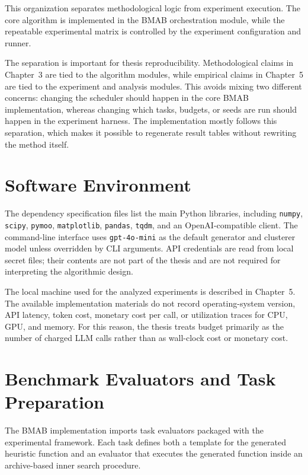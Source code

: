 This organization separates methodological logic from experiment execution. The core algorithm is implemented in the BMAB orchestration module, while the repeatable experimental matrix is controlled by the experiment configuration and runner.

The separation is important for thesis reproducibility. Methodological claims in Chapter~3 are tied to the algorithm modules, while empirical claims in Chapter~5 are tied to the experiment and analysis modules. This avoids mixing two different concerns: changing the scheduler should happen in the core BMAB implementation, whereas changing which tasks, budgets, or seeds are run should happen in the experiment harness. The implementation mostly follows this separation, which makes it possible to regenerate result tables without rewriting the method itself.

\section{Software Environment}

The dependency specification files list the main Python libraries, including \texttt{numpy}, \texttt{scipy}, \texttt{pymoo}, \texttt{matplotlib}, \texttt{pandas}, \texttt{tqdm}, and an OpenAI-compatible client. The command-line interface uses \texttt{gpt-4o-mini} as the default generator and clusterer model unless overridden by CLI arguments. API credentials are read from local secret files; their contents are not part of the thesis and are not required for interpreting the algorithmic design.

The local machine used for the analyzed experiments is described in Chapter~5. The available implementation materials do not record operating-system version, API latency, token cost, monetary cost per call, or utilization traces for CPU, GPU, and memory. For this reason, the thesis treats budget primarily as the number of charged LLM calls rather than as wall-clock cost or monetary cost.

\section{Benchmark Evaluators and Task Preparation}

The BMAB implementation imports task evaluators packaged with the experimental framework. Each task defines both a template for the generated heuristic function and an evaluator that executes the generated function inside an archive-based inner search procedure.

